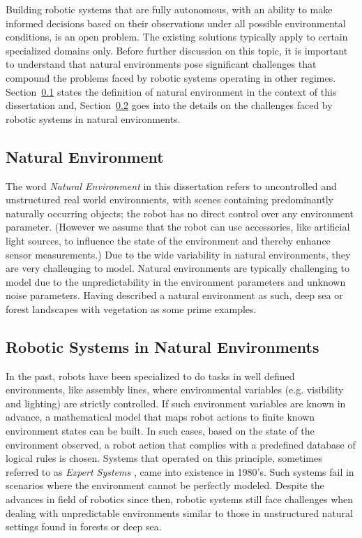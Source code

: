 Building robotic systems that are fully autonomous, with an ability to make informed decisions based on their observations under all possible environmental conditions, is an open problem.
The existing solutions typically apply to certain specialized domains only. 
Before further discussion on this topic, it is important to
understand that natural environments pose significant challenges that compound the problems faced by robotic systems operating in other regimes.
Section~\ref{sec:nat_environ_def} states the definition of natural environment in the context of this dissertation and, Section~\ref{sec:robots_nat_environ} goes into the details on the challenges faced by robotic systems in natural environments.


\subsection{Natural Environment}
\label{sec:nat_environ_def}

The word \emph{Natural Environment} in this dissertation refers to uncontrolled and unstructured real world environments, with scenes containing predominantly naturally occurring objects; the robot has 
no direct control over any environment parameter. (However we assume that the robot can use accessories, like artificial light sources, to influence the state of the environment and thereby enhance sensor measurements.) 
Due to the wide variability in natural environments, 
they are very challenging to model.
Natural environments are typically challenging to model due to the unpredictability in the environment parameters and unknown noise parameters. 
Having described a natural environment as such, deep sea or forest landscapes with vegetation as some prime examples.


\subsection{Robotic Systems in Natural Environments}
\label{sec:robots_nat_environ}

In the past, robots have been specialized to do tasks in well defined environments, like assembly lines, where environmental variables (e.g. visibility and lighting) are strictly controlled. If such environment variables are known in advance, a mathematical model that maps robot actions to finite known environment states can be built. In such cases, based on the state of the environment observed, a robot action that complies with a predefined database of logical rules is chosen. Systems that operated on this principle, sometimes referred to as \emph{Expert Systems} 
\cite{russel}, came into existence in 1980's. Such systems fail in scenarios where the environment cannot be perfectly modeled. Despite the advances in field of robotics since then, robotic systems still face challenges when dealing with unpredictable environments similar to those in unstructured natural settings found in forests or deep sea.

